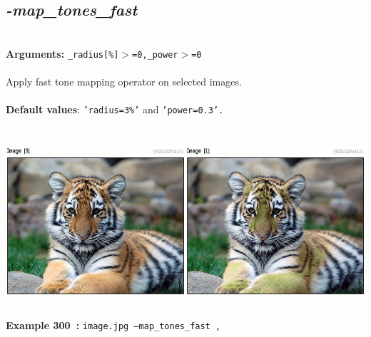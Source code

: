\documentclass[a4paper,11pt,twoside]{book}
\begin{document}
\subsection{\emph{-map\_tones\_fast} }\vspace*{-0.5em}
~\\\textbf{Arguments: } 
{\small \texttt{\_radius[\%]$>$=0,\_power$>$=0}}\\~\\
Apply fast tone mapping operator on selected images.
~\\~\\\textbf{Default values}: {\small \texttt{'radius=3\%'} and \texttt{'power=0.3'.}}
\begin{center}\includegraphics[keepaspectratio=true,height=7cm,width=\textwidth]{img/gmic_def300.jpg}\\
{\footnotesize \textbf{Example 300~:} \texttt{image.jpg --map\_tones\_fast ,}}
\end{center}
\end{document}
